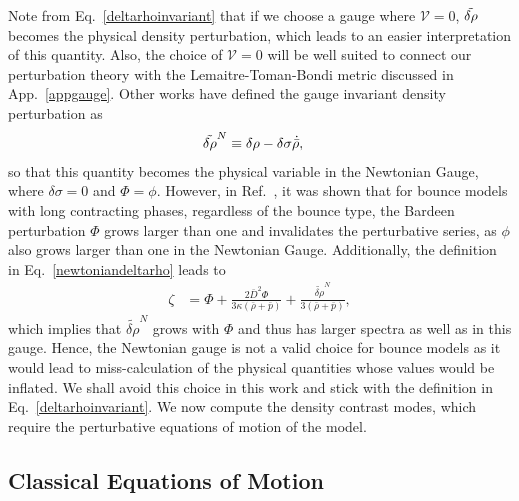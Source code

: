 \documentclass[a4paper,11pt]{article}
\begin{document}
Note from Eq.~\eqref{deltarhoinvariant} that if we choose a gauge where $\mathcal{V}
	=0$, $\Tilde{\delta\rho}$ becomes the physical density perturbation, which leads to an
easier interpretation of this quantity. Also, the choice of $\mathcal{V} =0$ will be
well suited to connect our perturbation theory with the Lemaitre-Toman-Bondi metric
discussed in App.~\ref{appgauge}.  Other works have defined the gauge invariant density
perturbation as
\begin{align}
	\label{newtoniandeltarho}
	\Tilde{\delta\rho}^{N} & \equiv \delta\rho - \delta\sigma \dot{\Bar{\rho}}
	,\end{align}
so that this quantity becomes the physical variable in the Newtonian Gauge, where
$\delta\sigma = 0$ and $\Phi = \phi$. However, in Ref.~\cite{vitenti2012large}, it was
shown that for bounce models with long contracting phases, regardless of the bounce
type, the Bardeen perturbation $\Phi$ grows larger than one and invalidates the
perturbative series, as $\phi$ also grows larger than one in the Newtonian Gauge.
Additionally, the definition in Eq.~\eqref{newtoniandeltarho} leads to
\begin{align}
	\zeta & = \Phi + \frac{2\bar{D}^2 \Phi}{3  \kappa (\bar{\rho}+\bar{p})} +
	\frac{{\tilde{\delta\rho}^N}} {3(\bar{\rho}+\bar{p})},
\end{align}
which implies that $\tilde{\delta\rho}^N$ grows with $\Phi$ and thus has larger spectra
as well as in this gauge. Hence, the Newtonian gauge is not a valid choice for bounce
models as it would lead to miss-calculation of the physical quantities whose values
would be inflated. We shall avoid this choice in this work and stick with the definition
in Eq.~\eqref{deltarhoinvariant}. We now compute the density contrast modes, which
require the perturbative equations of motion of the model.

\subsection{Classical Equations of Motion}
\end{document}
